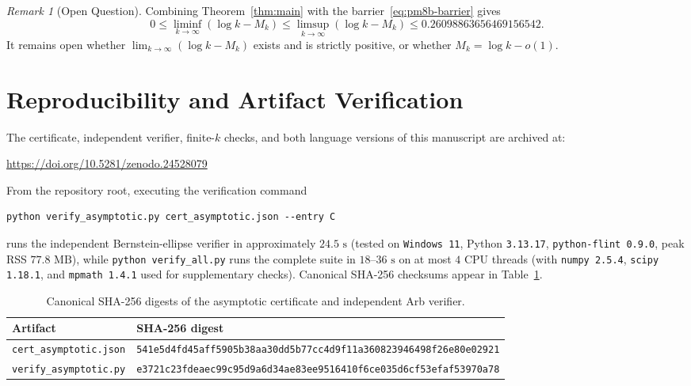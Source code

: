 \documentclass[11pt, reqno]{amsart}
\theoremstyle{remark}
\newtheorem{remark}[lemma]{Remark}
\numberwithin{equation}{section}
\begin{document}
\begin{remark}[Open Question]
Combining Theorem~\ref{thm:main} with the barrier~\eqref{eq:pm8b-barrier} gives
\[
0 \le \liminf_{k\to\infty}(\log k - M_k) \le \limsup_{k\to\infty}(\log k - M_k) \le 0.26098863656469156542.
\]
It remains open whether $\lim_{k\to\infty}(\log k - M_k)$ exists and is strictly positive, or
whether $M_k = \log k - o(1)$.
\end{remark}

\section{Reproducibility and Artifact Verification}\label{sec:repro}

The certificate, independent verifier, finite-$k$ checks, and both language versions of this manuscript
are archived at:
\begin{center}
\url{https://doi.org/10.5281/zenodo.24528079}
\end{center}
From the repository root, executing the verification command
\begin{samepage}
\begin{verbatim}
python verify_asymptotic.py cert_asymptotic.json --entry C
\end{verbatim}
\end{samepage}
runs the independent Bernstein-ellipse verifier in approximately $24.5\text{ s}$ (tested on
\texttt{Windows~11}, Python \texttt{3.13.17}, \texttt{python-flint 0.9.0}, peak RSS $77.8\text{ MB}$),
while \texttt{python verify\_all.py} runs the complete suite in $18\text{--}36\text{ s}$ on at most
$4$ CPU threads (with \texttt{numpy 2.5.4}, \texttt{scipy 1.18.1}, and \texttt{mpmath 1.4.1} used
for supplementary checks). Canonical SHA-256 checksums appear in Table~\ref{tab:sha256}.

\begin{table}[ht]
\centering
\caption{Canonical SHA-256 digests of the asymptotic certificate and independent Arb verifier.}\label{tab:sha256}
\small
\begin{tabular}{@{}ll@{}}
\toprule
Artifact & SHA-256 digest \\
\midrule
\texttt{cert\_asymptotic.json} & \texttt{\scriptsize 541e5d4fd45aff5905b38aa30dd5b77cc4d9f11a360823946498f26e80e02921} \\
\texttt{verify\_asymptotic.py} & \texttt{\scriptsize e3721c23fdeaec99c95d9a6d34ae83ee9516410f6ce035d6cf53efaf53970a78} \\
\bottomrule
\end{tabular}
\end{table}
\end{document}
